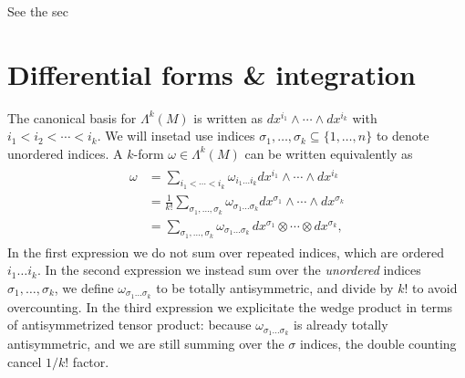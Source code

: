 See the sec







\section{Differential forms \& integration} 


\begin{mytheorem}
The canonical basis for $\Lambda^k(M)$ is written as $dx^{i_1} \wedge \cdots \wedge dx^{i_k}$ with $i_1 < i_2 < \cdots < i_k$.
We will insetad use indices $\sigma_1, \dots, \sigma_k \subseteq \{1, \dots, n\}$ to denote unordered indices.
A $k$-form $\omega \in \Lambda^k (M)$ can be written equivalently as
\begin{align}\label{eq:indices_bookkeeping_differential_forms}
\begin{aligned}
    \omega &= \sum_{i_1 < \cdots < i_k} \omega_{i_1 \dots i_k} dx^{i_1} \wedge \cdots \wedge dx^{i_k}
    \\
    &= \frac{1}{k!} \sum_{\sigma_1, \dots, \sigma_k} \omega_{\sigma_1 \dots \sigma_k} dx^{\sigma_1} \wedge \cdots \wedge dx^{\sigma_k}
    \\
    &= \sum_{\sigma_1, \dots, \sigma_k} \omega_{\sigma_1 \dots \sigma_k}\, dx^{\sigma_1} \otimes \cdots \otimes dx^{\sigma_k},
\end{aligned}
\end{align}
In the first expression we do not sum over repeated indices, which are ordered $i_1 \dots i_k$.
In the second expression we instead sum over the \emph{unordered} indices $\sigma_1, \dots, \sigma_k$, we define $\omega_{\sigma_1 \dots \sigma_k}$ to be totally antisymmetric, and divide by $k!$ to avoid overcounting.
In the third expression we explicitate the wedge product in terms of antisymmetrized tensor product: because $\omega_{\sigma_1 \dots \sigma_k}$ is already totally antisymmetric, and we are still summing over the $\sigma$ indices, the double counting cancel $1/k!$ factor.
\end{mytheorem}



